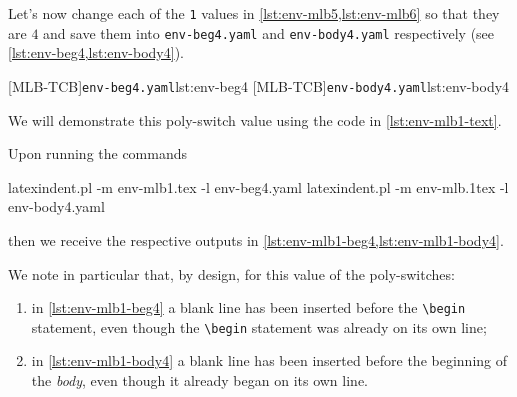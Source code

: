 \documentclass[10pt]{article}
\begin{document}
  \begin{example}
  Let's now change each of the \texttt{1} values in \cref{lst:env-mlb5,lst:env-mlb6} so
  that they are $4$ and save them into \texttt{env-beg4.yaml} and \texttt{env-body4.yaml}
  respectively (see \cref{lst:env-beg4,lst:env-body4}).   %

  \begin{cmhtcbraster}
   [MLB-TCB]{\texttt{env-beg4.yaml}}{lst:env-beg4}
   [MLB-TCB]{\texttt{env-body4.yaml}}{lst:env-body4}
  \end{cmhtcbraster}

  We will demonstrate this poly-switch value using the code in \cref{lst:env-mlb1-text}.


  Upon running the commands  

  \begin{commandshell}
latexindent.pl -m env-mlb1.tex -l env-beg4.yaml
latexindent.pl -m env-mlb.1tex -l env-body4.yaml
\end{commandshell}

  then we receive the respective outputs in \cref{lst:env-mlb1-beg4,lst:env-mlb1-body4}.

  \begin{cmhtcbraster}[raster column skip=.1\linewidth]
  \end{cmhtcbraster}

  We note in particular that, by design, for this value of the poly-switches:
  \begin{enumerate}
   \item in \cref{lst:env-mlb1-beg4} a blank line has been inserted before the
         \lstinline!\begin! statement, even though the \lstinline!\begin! statement was
         already on its own line;
   \item in \cref{lst:env-mlb1-body4} a blank line has been inserted before the beginning
         of the \emph{body}, even though it already began on its own line.
  \end{enumerate}
  \end{example}
\end{document}
